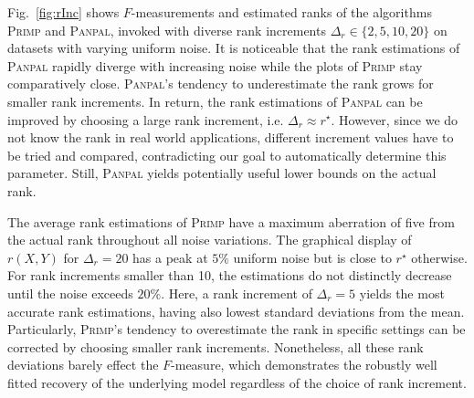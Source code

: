 Fig.~\ref{fig:rInc} shows $F$-measurements and estimated ranks of the algorithms \textsc{Primp} and \textsc{Panpal}, invoked with diverse rank increments $\Delta_r\in \{2,5,10,20\}$ on datasets with varying uniform noise. It is noticeable that the rank estimations of \textsc{Panpal} rapidly diverge  with increasing noise while the plots of \textsc{Primp} stay comparatively close. \textsc{Panpal}'s tendency to underestimate the rank grows for smaller rank increments. In return, the rank estimations of \textsc{Panpal} can be improved by choosing a large rank increment, i.e. $\Delta_r\approx r^\star$. However, since we do not know the rank in real world applications, different increment values have to be tried and compared, contradicting our goal to automatically determine this parameter. Still, \textsc{Panpal} yields potentially useful lower bounds on the actual rank.

The average rank estimations of \textsc{Primp} have a maximum aberration of five from the actual rank throughout all noise variations. The graphical display of $r(X,Y)$ for $\Delta_r=20$ has a peak at $5\%$ uniform noise but is close to $r^\star$ otherwise. For rank increments smaller than 10, the estimations do not distinctly decrease until the noise exceeds $20\%$. Here, a rank increment of $\Delta_r=5$ yields the most accurate rank estimations, having also lowest standard deviations from the mean. Particularly, \textsc{Primp}'s tendency to overestimate the rank in specific settings can be corrected by choosing smaller rank increments. Nonetheless, all these rank deviations barely effect the $F$-measure, which demonstrates the robustly well fitted recovery of the underlying model regardless of the choice of rank increment. 
